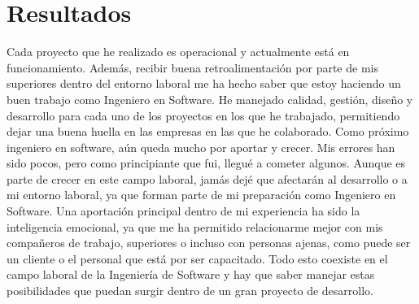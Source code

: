 \documentclass[protocolo.tex]{subfiles}
\begin{document}
\section{Resultados}
Cada proyecto que he realizado es operacional y actualmente está en funcionamiento.
Además, recibir buena retroalimentación por parte de mis superiores dentro del entorno
laboral me ha hecho saber que estoy haciendo un buen trabajo como Ingeniero en Software.
He manejado calidad, gestión, diseño y desarrollo para cada uno de los proyectos en los que
he trabajado, permitiendo dejar una buena huella en las empresas en las que he colaborado.
Como próximo ingeniero en software, aún queda mucho por aportar y crecer.
Mis errores han sido pocos, pero como principiante que fui, llegué a cometer algunos.
Aunque es parte de crecer en este campo laboral, jamás dejé que afectarán al desarrollo o a
mi entorno laboral, ya que forman parte de mi preparación como Ingeniero en Software.
Una aportación principal dentro de mi experiencia ha sido la inteligencia emocional, ya que
me ha permitido relacionarme mejor con mis compañeros de trabajo, superiores o incluso
con personas ajenas, como puede ser un cliente o el personal que está por ser capacitado.
Todo esto coexiste en el campo laboral de la Ingeniería de Software y hay que saber
manejar estas posibilidades que puedan surgir dentro de un gran proyecto de desarrollo.
\end{document}
